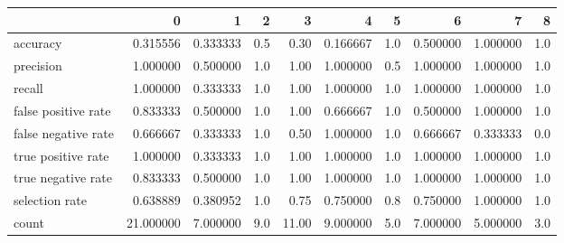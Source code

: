 \begin{tabular}{lrrrrrrrrr}
\toprule
{} &          0 &         1 &    2 &      3 &         4 &    5 &         6 &         7 &    8 \\
\midrule
accuracy            &   0.315556 &  0.333333 &  0.5 &   0.30 &  0.166667 &  1.0 &  0.500000 &  1.000000 &  1.0 \\
precision           &   1.000000 &  0.500000 &  1.0 &   1.00 &  1.000000 &  0.5 &  1.000000 &  1.000000 &  1.0 \\
recall              &   1.000000 &  0.333333 &  1.0 &   1.00 &  1.000000 &  1.0 &  1.000000 &  1.000000 &  1.0 \\
false positive rate &   0.833333 &  0.500000 &  1.0 &   1.00 &  0.666667 &  1.0 &  0.500000 &  1.000000 &  1.0 \\
false negative rate &   0.666667 &  0.333333 &  1.0 &   0.50 &  1.000000 &  1.0 &  0.666667 &  0.333333 &  0.0 \\
true positive rate  &   1.000000 &  0.333333 &  1.0 &   1.00 &  1.000000 &  1.0 &  1.000000 &  1.000000 &  1.0 \\
true negative rate  &   0.833333 &  0.500000 &  1.0 &   1.00 &  1.000000 &  1.0 &  1.000000 &  1.000000 &  1.0 \\
selection rate      &   0.638889 &  0.380952 &  1.0 &   0.75 &  0.750000 &  0.8 &  0.750000 &  1.000000 &  1.0 \\
count               &  21.000000 &  7.000000 &  9.0 &  11.00 &  9.000000 &  5.0 &  7.000000 &  5.000000 &  3.0 \\
\bottomrule
\end{tabular}
